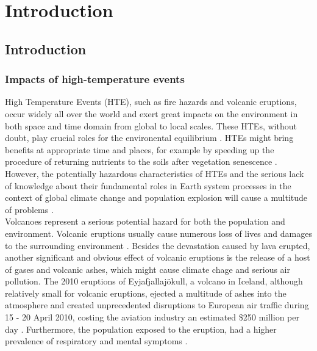 \chapter{Introduction}

\label{Chapter1}

\newcommand{\keyword}[1]{\textbf{#1}}
\newcommand{\tabhead}[1]{\textbf{#1}}
\newcommand{\code}[1]{\texttt{#1}}
\newcommand{\file}[1]{\texttt{\bfseries#1}}
\newcommand{\option}[1]{\texttt{\itshape#1}}


\section{Introduction}


\subsection{Impacts of high-temperature events}

High Temperature Events (HTE), such as fire hazards and volcanic eruptions, occur widely all over the world and exert great impacts on the environment in both space and time domain from global to local scales. These HTEs, without doubt, play crucial roles for the environental equilibrium \parencite{Reference1}. HTEs might bring benefits at appropriate time and places, for example by speeding up the procedure of returning nutrients to the soils after vegetation senescence \parencite{Reference2}. However, the potentially hazardous characteristics of HTEs and the serious lack of knowledge about their fundamental roles in Earth system processes in the context of global climate change and population explosion will cause a multitude of problems \parencite{Reference3}.\\

\noindent Volcanoes represent a serious potential hazard for both the population and environment. Volcanic eruptions usually cause numerous loss of lives and damages to the surrounding environment \parencite{Reference12}. Besides the devastation caused by lava erupted, another significant and obvious effect of volcanic eruptions is the release of a host of gases and volcanic ashes, which might cause climate chage and serious air pollution. The 2010 eruptions of Eyjafjallajökull, a volcano in Iceland, although relatively small for volcanic eruptions, ejected a multitude of ashes into the atmosphere and created unprecedented disruptions to European air traffic during 15 - 20 April 2010, costing the aviation industry an estimated \$250 million per day \parencite{Reference4}. Furthermore, the population exposed to the eruption, had a higher prevalence of respiratory and mental symptoms \parencite{Reference5}.\\

